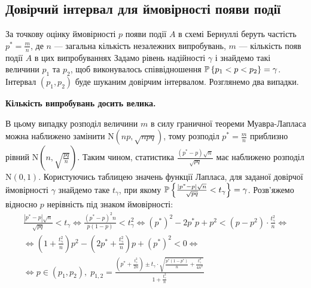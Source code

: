 \subsection{Довірчий інтервал для ймовірності появи події}
За точкову оцінку ймовірності $p$ появи події $A$
в схемі Бернуллі беруть частість $p^* = \frac{m}{n}$, де $n$ ---
загальна кількість незалежних випробувань,
$m$ --- кількість появ події $A$ в цих випробуваннях
Задамо рівень надійності $\gamma$
і знайдемо такі величини $p_1$ та $p_2$, щоб
виконувалось співвідношення $\P\left\{ p_1 < p < p_2\right\} = \gamma$.
Інтервал $(p_1, p_2)$ буде шуканим довірчим інтервалом. Розглянемо два випадки.

\noindent\textbf{Кількість випробувань досить велика.} 

В цьому випадку розподіл величини $m$ в силу граничної теореми Муавра-Лапласа 
можна наближено замінити $\mathrm{N}(np, \sqrt{npq})$, тому
розподіл $p^* = \frac{m}{n}$ приблизно рівний $\mathrm{N}\left(n, \sqrt{\frac{pq}{n}} \right)$.
Таким чином, статистика $\frac{(p^* - p)\sqrt{n}}{\sqrt{pq}}$ має наближено розподіл $\mathrm{N}(0, 1)$.
Користуючись таблицею значень функції Лапласа, для заданої довірчої ймовірності $\gamma$ знайдемо таке $t_{\gamma}$,
при якому 
$\P\left\{\frac{|p^* - p|\sqrt{n}}{\sqrt{pq}} < t_{\gamma}\right\} = \gamma$. Розв'яжемо відносно $p$ нерівність під знаком ймовірності:
\begin{gather*}
    \frac{|p^* - p|\sqrt{n}}{\sqrt{pq}} < t_{\gamma} \Leftrightarrow
    \frac{(p^* - p)^2 n}{p(1-p)} < t^2_{\gamma} \Leftrightarrow
    (p^*)^2 - 2p^* p + p^2 < \left(p - p^2\right)\cdot \frac{t^2_{\gamma}}{n} \Leftrightarrow \\
    \Leftrightarrow
    \left(1 + \frac{t^2_{\gamma}}{n}\right)p^2 - \left(2p^* + \frac{t^2_{\gamma}}{n}\right)p + (p^*)^2 < 0 \Leftrightarrow \\
    \Leftrightarrow
    p \in (p_1, p_2), \; p_{1, 2} = \frac{\left(p^* + \frac{t^2_{\gamma}}{2n}\right) \pm t_{\gamma} \cdot \sqrt{\frac{p^*(1-p^*)}{n} + \frac{t^2_{\gamma}}{4n^2}}}{1 + \frac{t^2_{\gamma}}{n}}
\end{gather*}

